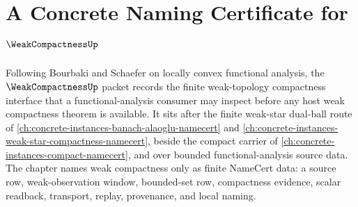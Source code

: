 \chapter{A Concrete Naming Certificate for $\WeakCompactnessUp$}
\label{ch:concrete-instances-weak-compactness-namecert}

Following Bourbaki and Schaefer on locally convex functional analysis, the $\WeakCompactnessUp$ packet records the finite weak-topology compactness interface that a functional-analysis consumer may inspect before any host weak compactness theorem is available. It sits after the finite weak-star dual-ball route of \autoref{ch:concrete-instances-banach-alaoglu-namecert} and \autoref{ch:concrete-instances-weak-star-compactness-namecert}, beside the compact carrier of \autoref{ch:concrete-instances-compact-namecert}, and over bounded functional-analysis source data. The chapter names weak compactness only as finite NameCert data: a source row, weak-observation window, bounded-set row, compactness evidence, scalar readback, transport, replay, provenance, and local naming.


